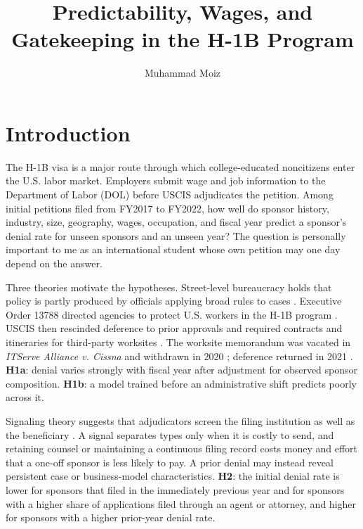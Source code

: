 \documentclass[9pt,twoside]{pnas-new}
\title{Predictability, Wages, and Gatekeeping in the H-1B Program}
\author[a,1]{Muhammad Moiz}
\affil[a]{Dartmouth College, Hanover, NH 03755}
\begin{document}
\maketitle
\thispagestyle{firststyle}

\section*{Introduction}

The H-1B visa is a major route through which college-educated noncitizens enter the U.S. labor market. Employers submit wage and job information to the Department of Labor (DOL) before USCIS adjudicates the petition. Among initial petitions filed from FY2017 to FY2022, how well do sponsor history, industry, size, geography, wages, occupation, and fiscal year predict a sponsor's denial rate for unseen sponsors and an unseen year? The question is personally important to me as an international student whose own petition may one day depend on the answer.

Three theories motivate the hypotheses. Street-level bureaucracy holds that policy is partly produced by officials applying broad rules to cases \cite{lipsky1980}. Executive Order 13788 directed agencies to protect U.S. workers in the H-1B program \cite{eo13788}. USCIS then rescinded deference to prior approvals \cite{uscis2017deference} and required contracts and itineraries for third-party worksites \cite{uscis2018memo}. The worksite memorandum was vacated in \emph{ITServe Alliance v. Cissna} and withdrawn in 2020 \cite{itserve2020,uscis2020rescind}; deference returned in 2021 \cite{uscis2021deference}. \textbf{H1a}: denial varies strongly with fiscal year after adjustment for observed sponsor composition. \textbf{H1b}: a model trained before an administrative shift predicts poorly across it.

Signaling theory suggests that adjudicators screen the filing institution as well as the beneficiary \cite{spence1973}. A signal separates types only when it is costly to send, and retaining counsel or maintaining a continuous filing record costs money and effort that a one-off sponsor is less likely to pay. A prior denial may instead reveal persistent case or business-model characteristics. \textbf{H2}: the initial denial rate is lower for sponsors that filed in the immediately previous year and for sponsors with a higher share of applications filed through an agent or attorney, and higher for sponsors with a higher prior-year denial rate.
\end{document}
